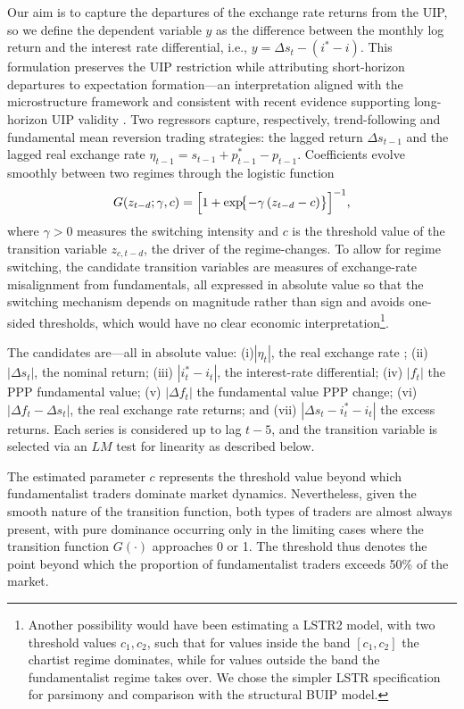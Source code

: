 \documentclass[a4paper,10pt,final]{article}    %
\begin{document}
Our aim is to capture the departures of the exchange rate returns from the UIP, so we define the dependent variable $y$ as the difference between the monthly log return and the interest rate differential, i.e.,
$y = \Delta s_{t} - (i^* - i)$. This formulation preserves the UIP restriction while attributing short-horizon departures to expectation formation---an interpretation aligned with the microstructure framework \citep{Evans2011} and consistent with recent evidence supporting long-horizon UIP validity \citep{baillie2025yes}. Two regressors capture, respectively, trend-following and fundamental mean reversion trading strategies: the lagged return $\Delta s_{t-1}$ and the lagged real exchange rate $\eta_{t-1}=s_{t-1}+p^*_{t-1}-p_{t-1}$. Coefficients evolve smoothly between two regimes through the logistic function
\[
    G\!\left(z_{t-d};\gamma ,c\right)
    =\Bigl[1+\exp\!\bigl\{-\gamma\,(z_{t-d}-c)\bigr\}\Bigr]^{-1},
\]
where $\gamma>0$ measures the switching intensity and $c$ is the threshold value of the transition variable $z_{c,t-d}$, the driver of the regime-changes. To allow for regime switching, the candidate transition variables are measures of exchange-rate misalignment from fundamentals, all expressed in absolute value so that the switching mechanism depends on magnitude rather than sign and avoids one-sided thresholds, which would have no clear economic interpretation\footnote{Another possibility would have been estimating a LSTR2 model, with two threshold values $c_1,c_2$, such that for values inside the band $[c_1,c_2]$ the chartist regime dominates, while for values outside the band the fundamentalist regime takes over. We chose the simpler LSTR specification for parsimony and comparison with the structural BUIP model.}.

The candidates are---all in absolute value: (i)$|\eta_t|$, the real exchange rate ; (ii) $|\Delta s_t|$, the nominal return; (iii) $|i_t^{*}-i_t|$, the interest-rate differential; (iv) $|f_t|$ the PPP fundamental value; (v) $|\Delta f_t|$ the fundamental value PPP change; (vi) $|\Delta f_t - \Delta s_t|$, the real exchange rate returns; and (vii) $|\Delta s_t - i_t^{*}-i_t|$ the excess returns. Each series is considered up to lag $t-5$, and the transition variable is selected via an $LM$ test for linearity as described below.

The estimated parameter $c$ represents the threshold value beyond which fundamentalist traders dominate market dynamics. Nevertheless, given the smooth nature of the transition function, both types of traders are almost always present, with pure dominance occurring only in the limiting cases where the transition function $G(\cdot)$ approaches 0 or 1. The threshold thus denotes the point beyond which the proportion of fundamentalist traders exceeds 50\% of the market.
\end{document}
